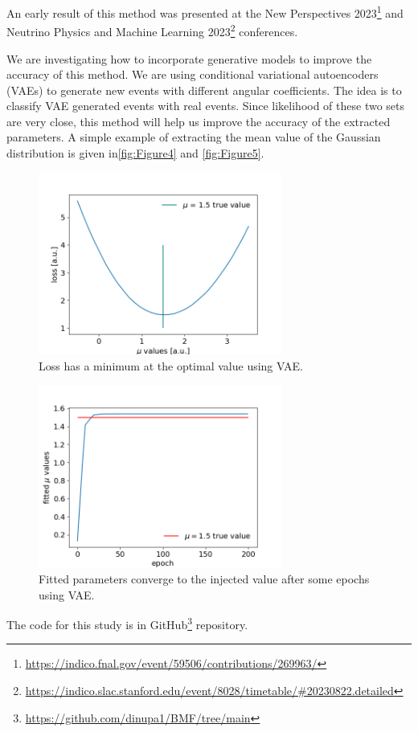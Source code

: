 \documentclass{article}
\begin{document}
An early result of this method was presented at the New Perspectives 2023\footnote{\url{https://indico.fnal.gov/event/59506/contributions/269963/}} and Neutrino Physics and Machine Learning 2023\footnote{\url{https://indico.slac.stanford.edu/event/8028/timetable/\#20230822.detailed}} conferences.

We are investigating how to incorporate generative models to improve the accuracy of this method\cite{Diefenbacher:2020rna}. We are using conditional variational autoencoders\cite{kingma2013auto} (VAEs) to generate new events with different angular coefficients. The idea is to classify VAE generated events with real events. Since likelihood of these two sets are very close, this method will help us improve the accuracy of the extracted parameters. A simple example of extracting the mean value of the Gaussian distribution is given in\autoref{fig:Figure4} and \autoref{fig:Figure5}.

\begin{figure}[H]
\begin{center}
	\includegraphics[width=8.0cm]{imgs/scan_opt.png}
	\caption{Loss has a minimum at the optimal value using VAE.}
	\label{fig:Figure4}
\end{center}
\end{figure}

\begin{figure}[H]
\begin{center}
	\includegraphics[width=8.0cm]{imgs/opt_params.png}
	\caption{Fitted parameters converge to the injected value after some epochs using VAE.}
	\label{fig:Figure5}
\end{center}
\end{figure}

The code for this study is in GitHub\footnote{\url{https://github.com/dinupa1/BMF/tree/main}} repository.

\medskip

\printbibliography
\end{document}
